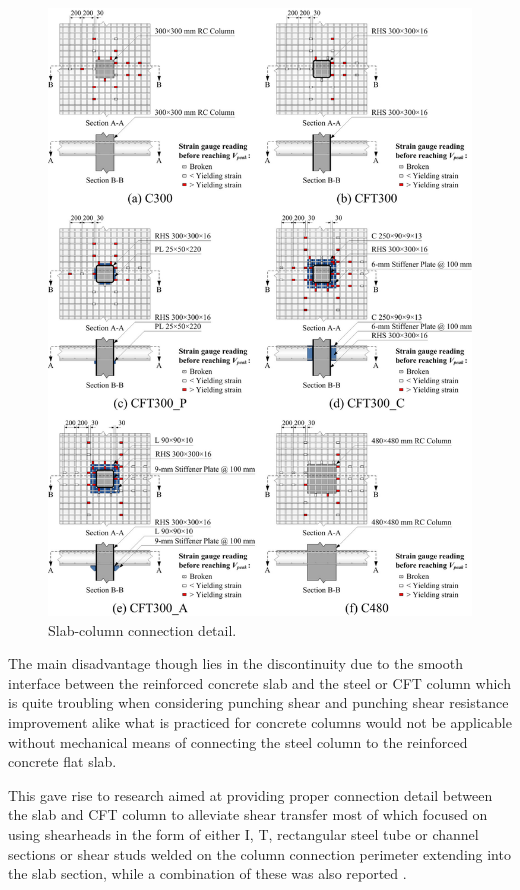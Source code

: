 \begin{figure}\centering
    \includegraphics[width=\columnwidth]{Figures/c2020f3.pdf}
    \caption{Slab-column connection detail\citep{chen2020}.}
    \label{c2020f3}
    \end{figure}

The main disadvantage though lies in the discontinuity due to the smooth interface between the reinforced concrete slab and the steel or CFT column which is quite troubling when considering punching shear and punching shear resistance improvement alike what is practiced for concrete columns would not be applicable without mechanical means of connecting the steel column to the reinforced concrete flat slab.

This gave rise to research aimed at providing proper connection detail between the slab and CFT column to alleviate shear transfer most of which focused on using shearheads\citep{satoh2004experimental,lee2005,LEE2008418,yamaguchi2008experimental,eder2010,EDER20111164,EDER2012239,JU2013297,kim2014shearhead,yan2014,Bompa2016a,lee2019seismic,li2012,wang2013,yan2008} in the form of either I, T, rectangular steel tube or channel sections or shear studs welded on the column connection perimeter extending into the slab section\citep{yu2018}, while a combination of these was also reported \citep{LEE2008418}. 

